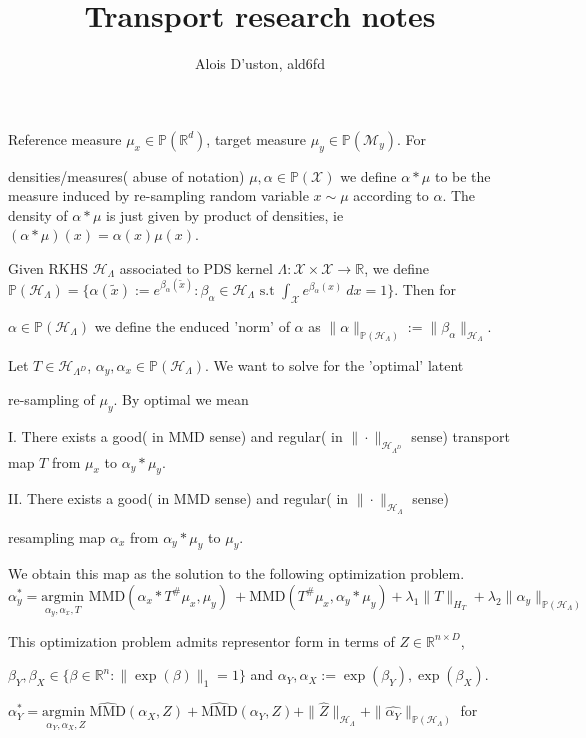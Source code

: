 \documentclass[11pt]{article}
\title{ Transport research notes}
\author{Alois D'uston,  ald6fd}
\newcommand{\sms}{{\smallskip}}
\newcommand{\R}{\mathbb{R}}
\newcommand{\norm}[2]{\| #1 \|_{#2}}
\newcommand{\probp}{\mathbb{P}}
\newcommand{\func}[3]{#1: #2\rightarrow#3}
\begin{document}
Reference measure $\mu_x \in \probp(\R^d)$,  target measure $\mu_y \in  \probp(\mathcal{M}_y)$.
For 

densities/measures( abuse of notation) $\mu,  \alpha \in \probp(\mathcal{X})$ we define $\alpha \ast \mu$ to be the measure induced by re-sampling random variable $x \sim \mu$ according to $\alpha$. 
The density of $ \alpha \ast \mu$ is just given by product of densities, ie $(\alpha \ast \mu)(x) =  \alpha(x)\mu(x)$.  

Given RKHS $ \mathcal{H}_{\Lambda}$ associated to  PDS kernel $\func{\Lambda}{\mathcal{X} \times \mathcal{X}}{\R}$,  we define
$\probp(\mathcal{H}_{\Lambda}) = \{\alpha(\tilde{x}):= e^{\beta_{\alpha}(\tilde{x})} :  \beta_{\alpha} \in  \mathcal{H}_{\Lambda} \text{ s.t } \int_{\mathcal{X}} e^{\beta_{\alpha}(x)} \: dx = 1  \}$.
Then  for

 $\alpha \in \probp(\mathcal{H}_{\Lambda}) $ we define the enduced 'norm' of $\alpha$ as $\norm{\alpha}{\probp(\mathcal{H}_{\Lambda})} :=  \norm{\beta_{\alpha}}{\mathcal{H}_{\Lambda}} $.

Let $T \in \mathcal{H}_{\Lambda^D}$,   $\alpha_y, \alpha_x \in \probp(\mathcal{H}_{\Lambda})$.  We want to solve for the 'optimal' latent 

re-sampling of $\mu_y$.   By optimal we mean 

I.  There exists a good( in MMD sense) and regular( in $\norm{\cdot}{\mathcal{H}_{\Lambda^D}}$ sense) transport map $T$ from $\mu_x$ to $\alpha_y \ast \mu_y$.

II.  There exists a good( in MMD sense) and regular( in $\norm{\cdot}{\mathcal{H}_{\Lambda}}$ sense) 

resampling map  $\alpha_x$ from  $\alpha_y \ast \mu_y$ to $\mu_y$.   

We obtain this map as the solution to the following optimization problem.
$$\alpha_y^* = \underset{\alpha_y, \alpha_x,  T}{\text{argmin}} \text{ MMD}(\alpha_x \ast T^{\#}\mu_x,  \mu_y)\: + \text{MMD}(T^{\#}\mu_x,  \alpha_y \ast			\mu_y) +\lambda_1\norm{T}{H_T}  + \lambda_2\norm{\alpha_y}{\probp(\mathcal{H}_{\Lambda})}$$

This optimization problem admits representor form  in terms of 
$Z \in \R^{n \times D}$,  

$ \beta_Y, \beta_X   \in \{ \beta \in \R^n:  \norm{\exp(\beta)}{1} = 1\}$ and $\alpha_Y,  \alpha_X := \exp(\beta_Y),   \exp(\beta_X)$.

\sms

 $\alpha_Y^* = \underset{\alpha_Y,   \alpha_X,  Z}{\text{argmin }}  \hat{\text{MMD}}(\alpha_X,  Z) + \hat{\text{MMD}}(\alpha_Y,  Z)  + \norm{\hat{Z}}{\mathcal{H}_\Lambda} + \norm{\hat{\alpha_Y}}{\probp(\mathcal{H}_{\Lambda})} $  for
\end{document}
